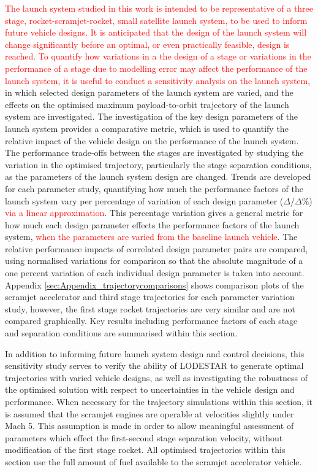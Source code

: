 \textcolor{red}{The launch system studied in this work is intended to be representative of a three stage, rocket-scramjet-rocket, small satellite launch system, to be used to inform future vehicle designs. It is anticipated that the design of the launch system will change significantly before an optimal, or even practically feasible, design is reached. 
	To quantify how variations in a the design of a stage or variations in the performance of a stage due to modelling error may affect the performance of the launch system, it is useful to conduct a sensitivity analysis on the launch system}, in which selected design parameters of the launch system are varied, and the effects on the optimised maximum payload-to-orbit trajectory of the launch system are investigated.
The investigation of the key design parameters of the launch system provides a comparative metric, which is used to quantify the relative impact of the vehicle design on the performance of the launch system. The performance trade-offs between the stages are investigated by studying the variation in the optimised trajectory, particularly the stage separation conditions, as the parameters of the launch system design are changed. 
Trends are developed for each parameter study, quantifying how much the performance factors of the launch system vary per percentage of variation of each design parameter ($\Delta$/$\Delta$\%) \textcolor{red}{via a linear approximation}. This percentage variation gives a general metric for how much each design parameter effects the performance factors of the launch system, \textcolor{red}{when the parameters are varied from the baseline launch vehicle}. The relative performance impacts of correlated design parameter pairs are compared, using normalised variations for comparison so that the absolute magnitude of a one percent variation of each individual design parameter is taken into account.
Appendix \ref{sec:Appendix_trajectorycomparisons} shows comparison plots of the scramjet accelerator and third stage trajectories for each parameter variation study, however, the first stage rocket trajectories are very similar and are not compared graphically. Key results including performance factors of each stage and separation conditions are summarised within this section.


In addition to informing future launch system design and control decisions, this sensitivity study serves to verify the ability of LODESTAR to generate optimal trajectories with varied vehicle designs, as well as investigating the robustness of the optimised solution with respect to uncertainties in the vehicle design and performance.
When necessary for the trajectory simulations within this section, it is assumed that the scramjet engines are operable at velocities slightly under Mach 5. This assumption is made in order to allow meaningful assessment of parameters which effect the first-second stage separation velocity, without modification of the first stage rocket.
All optimised trajectories within this section use the full amount of fuel available to the scramjet accelerator vehicle. 



